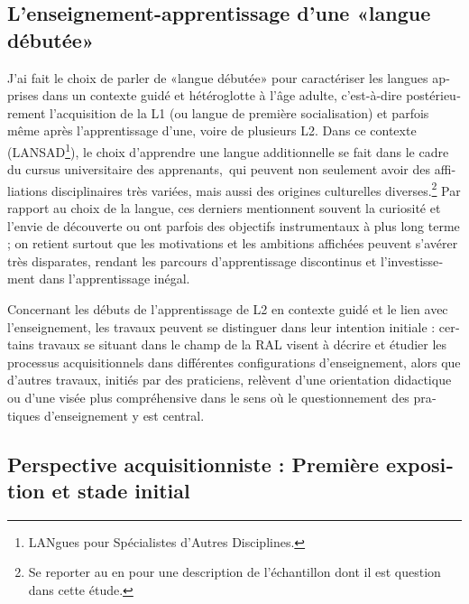 \documentclass[output=paper]{langscibook}
\begin{document}
\begin{otherlanguage}{french}
\section{L’enseignement-apprentissage d’une «langue débutée»}\label{sec:felce:3}
\begin{sloppypar}
J'ai fait le choix de parler de «langue débutée» pour caractériser les langues apprises dans un contexte guidé et hétéroglotte à l’âge adulte, c’est-à-dire postérieurement l’acquisition de la L1 (ou langue de première socialisation) et parfois même après l’apprentissage d’une, voire de plusieurs L2. Dans ce contexte (LANSAD\footnote{LANgues pour Spécialistes d’Autres Disciplines.}), le choix d’apprendre une langue additionnelle se fait dans le cadre du cursus universitaire des apprenants,~qui peuvent non seulement avoir des affiliations disciplinaires très variées, mais aussi des origines culturelles diverses.\footnote{Se reporter au  en  pour une description de l’échantillon dont il est question dans cette étude.} Par rapport au choix de la langue, ces derniers mentionnent souvent la curiosité et l’envie de découverte ou ont parfois des objectifs instrumentaux à plus long terme ; on retient surtout que les motivations et les ambitions affichées peuvent s’avérer très disparates, rendant les parcours d’apprentissage discontinus et l’investissement dans l’apprentissage inégal.
\end{sloppypar}

Concernant les débuts de l’apprentissage de L2 en contexte guidé et le lien avec l’enseignement, les travaux peuvent se distinguer dans leur intention initiale : certains travaux se situant dans le champ de la RAL visent à décrire et étudier les processus acquisitionnels dans différentes configurations d’enseignement, alors que d’autres travaux, initiés par des praticiens, relèvent d’une orientation didactique ou d’une visée plus compréhensive dans le sens où le questionnement des pratiques d’enseignement y est central.

\subsection{Perspective acquisitionniste : Première exposition et stade initial} \label{sec:felce:3.1}


\end{otherlanguage}
\end{document}
